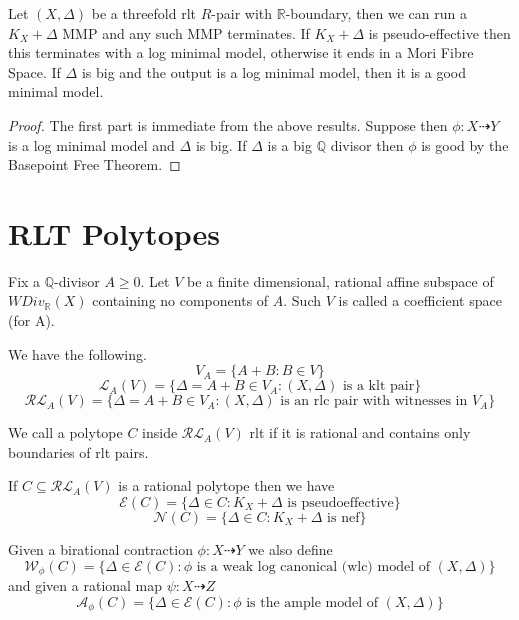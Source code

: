 \begin{theorem}\label{rltmmp}
	Let $(X,\Delta)$ be a threefold rlt $R$-pair with $\mathbb{R}$-boundary, then we can run a $K_{X}+\Delta$ MMP and any such MMP terminates. If $K_{X}+\Delta$ is pseudo-effective then this terminates with a log minimal model, otherwise it ends in a Mori Fibre Space. If $\Delta$ is big and the output is a log minimal model, then it is a good minimal model.
\end{theorem}


\begin{proof}
	The first part is immediate from the above results. Suppose then $\phi:X \dashrightarrow Y$ is a log minimal model and $\Delta$ is big. If $\Delta$ is a big $\mathbb{Q}$ divisor then $\phi$ is good by the Basepoint Free Theorem. 
\end{proof}

	\section{RLT Polytopes}
	
	\begin{definition}
		
		Fix a $\mathbb{Q}$-divisor $A\geq 0$. Let $V$ be a finite dimensional, rational affine subspace of $WDiv_{\mathbb{R}}(X)$ containing no components of $A$. Such $V$ is called a coefficient space (for A).
		
		We have the following.
		\[V_{A}= \{A+B: B \in V\}\]
		\[\mathcal{L}_{A}(V)=\{\Delta=A+B \in V_{A}: (X,\Delta) \text{ is a klt pair}\}\]
		\[\mathcal{RL}_{A}(V)=\{\Delta=A+B \in V_{A}: (X,\Delta) \text{ is an rlc pair with witnesses in } V_{A}\}\]
		
		We call a polytope $C$ inside $\mathcal{RL}_{A}(V)$ rlt if it is rational and contains only boundaries of rlt pairs.
		
		If $C \subseteq \mathcal{RL}_{A}(V)$ is a rational polytope then we have
		\[\mathcal{E}(C)=\{\Delta \in C: K_{X}+\Delta \text{ is pseudoeffective}\}\]
		\[\mathcal{N}(C)=\{\Delta \in C: K_{X}+\Delta \text{ is nef}\}\]
		
		Given a birational contraction $\phi:X \dashrightarrow Y$ we also define
		\[\mathcal{W}_{\phi}(C)=\{\Delta \in \mathcal{E}(C): \phi \text{ is a weak log canonical (wlc) model of } (X,\Delta)\}\]
		and given a rational map $\psi:X \dashrightarrow Z$
		\[\mathcal{A}_{\phi}(C)=\{\Delta \in \mathcal{E}(C): \phi \text{ is the ample model of } (X,\Delta)\}\]
	\end{definition}
	
